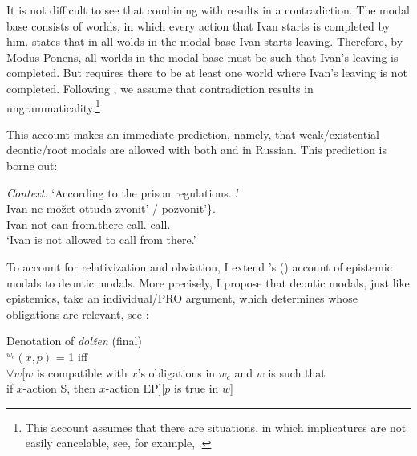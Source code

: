 \documentclass[output=paper,
modfonts,
newtxmath,colorlinks,citecolor=brown
]{langscibook}
\begin{document}
\ea \label{mb} 
 	\z \z 

\noindent It is not difficult to see that combining  with  results in a contradiction. The modal base consists of worlds, in which every action that Ivan starts is completed by him.  states that in all wolds in the modal base Ivan starts leaving. Therefore, by Modus Ponens, all worlds in the modal base must be such that Ivan's leaving is completed. But  requires there to be at least one world where Ivan's leaving is not completed. Following \citet{gaj02}, we assume that contradiction results in ungrammaticality.\footnote{This account assumes that there are situations, in which implicatures are not easily cancelable,  see, for example, \cite{mag09,mag11}.
}

This account makes an immediate prediction, namely, that weak/existential deontic/root modals are allowed with both \im and \p in Russian. This prediction is borne out:

\ea \textit{Context:} `According to the prison regulations...' \\
    \gll Ivan ne mo\v zet ottuda \minsp{\{} zvonit' / pozvonit'\}. \\
	Ivan not can from.there {} {call.\im} {} {call.\p} {} \\
	\glt `Ivan is not allowed to call from there.' \label{existdeon}
	\z 

\noindent To account for relativization and obviation, I extend \citeauthor{ste07a}'s (\citeyear{ste07a}) account of epistemic modals to deontic modals. More precisely, I propose that deontic modals, just like epistemics, take an individual/PRO argument, which determines whose obligations are relevant, see :

\ea Denotation of \textit{dolžen} (final) \\
	$^{w_c}(x,p)$ = 1 iff \\
    $\forall w$[$w$ is compatible with $x$'s obligations in $w_c$ and $w$ is such that \\
    if $x$-action S, then $x$-action EP][$p$ is true in $w$]  \label{sxdolzhenfinal}
        \z
        
\end{document}

